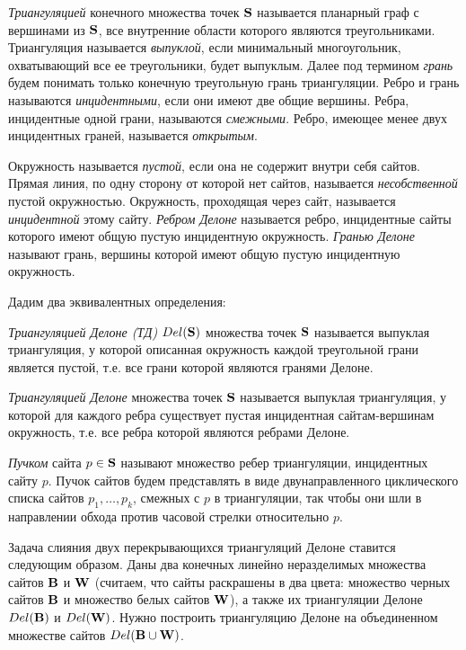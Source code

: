 \documentclass[12pt]{article}
\begin{document}
{\it Триангуляцией} конечного множества точек $\bf{S}$ называется планарный граф с вершинами из $\bf{S}$,
все внутренние области которого являются треугольниками.
Триангуляция называется {\it выпуклой}, если минимальный многоугольник, охватывающий все ее треугольники, будет выпуклым.
Далее под термином {\it грань} будем понимать только конечную треугольную грань триангуляции.
Ребро и грань называются {\it инцидентными}, если они имеют две общие вершины.
Ребра, инцидентные одной грани, называются {\it смежными}.
Ребро, имеющее менее двух инцидентных граней, называется {\it открытым}.

Окружность называется {\it пустой}, если она не содержит внутри себя сайтов.
Прямая линия, по одну сторону от которой нет сайтов, называется {\it несобственной} пустой окружностью.
Окружность, проходящая через сайт, называется {\it инцидентной} этому сайту.
{\it Ребром Делоне} называется ребро, инцидентные сайты которого имеют общую пустую инцидентную окружность.
{\it Гранью Делоне} называют грань, вершины которой имеют общую пустую инцидентную окружность.

Дадим два эквивалентных определения:

\begin{definition}
{\it Триангуляцией Делоне (ТД) $Del(\bf{S})$} множества точек $\bf{S}$ называется выпуклая триангуляция,
у которой описанная окружность каждой треугольной грани является пустой,
т.е. все грани которой являются гранями Делоне.
\end{definition}

\begin{definition}
{\it Триангуляцией Делоне} множества точек $\bf{S}$ называется выпуклая триангуляция,
у которой для каждого ребра существует пустая инцидентная сайтам-вершинам окружность,
т.е. все ребра которой являются ребрами Делоне.
\end{definition}

{\it Пучком} сайта $p \in \bf{S}$ называют множество ребер триангуляции, инцидентных сайту $p$.
Пучок сайтов будем представлять в виде двунаправленного циклического списка сайтов $p_1, \ldots, p_k$,
смежных с $p$ в триангуляции, так чтобы они шли в направлении обхода против часовой стрелки относительно $p$.

Задача слияния двух перекрывающихся триангуляций Делоне ставится следующим образом.
Даны два конечных линейно неразделимых множества сайтов $\bf{B}$ и $\bf{W}$ (считаем, что сайты раскрашены в два цвета: множество черных сайтов $\bf{B}$ и множество белых сайтов $\bf{W}$),
а также их триангуляции Делоне $Del(\bf{B})$ и $Del(\bf{W})$.
Нужно построить триангуляцию Делоне на объединенном множестве сайтов $Del(\bf{B} \cup \bf{W})$.
\end{document}
